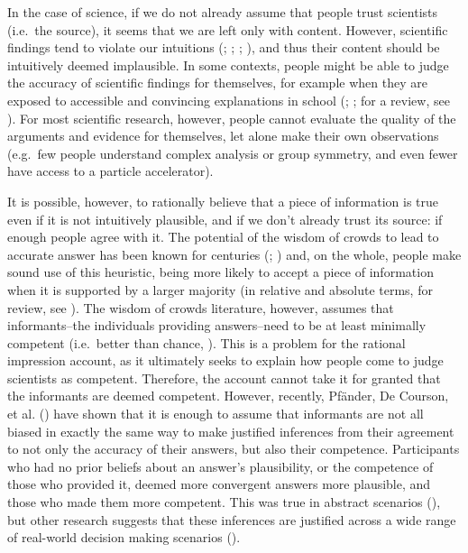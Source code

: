 \documentclass[
  man,
  floatsintext,
  longtable,
  nolmodern,
  notxfonts,
  notimes,
  colorlinks=true,linkcolor=blue,citecolor=blue,urlcolor=blue]{apa7}
\begin{document}
In the case of science, if we do not already assume that people trust
scientists (i.e.~the source), it seems that we are left only with
content. However, scientific findings tend to violate our intuitions
(;
;
;
), and
thus their content should be intuitively deemed implausible. In some
contexts, people might be able to judge the accuracy of scientific
findings for themselves, for example when they are exposed to accessible
and convincing explanations in school
(;
; for a review, see
). For most scientific research, however, people cannot evaluate
the quality of the arguments and evidence for themselves, let alone make
their own observations (e.g.~few people understand complex analysis or
group symmetry, and even fewer have access to a particle accelerator).

It is possible, however, to rationally believe that a piece of
information is true even if it is not intuitively plausible, and if we
don't already trust its source: if enough people agree with it. The
potential of the wisdom of crowds to lead to accurate answer has been
known for centuries
(;
)
and, on the whole, people make sound use of this heuristic, being more
likely to accept a piece of information when it is supported by a larger
majority (in relative and absolute terms, for review, see
). The
wisdom of crowds literature, however, assumes that informants--the
individuals providing answers--need to be at least minimally competent
(i.e.~better than chance,
).
This is a problem for the rational impression account, as it ultimately
seeks to explain how people come to judge scientists as competent.
Therefore, the account cannot take it for granted that the informants
are deemed competent. However, recently, Pfänder, De Courson, et al.
() have shown that it is
enough to assume that informants are not all biased in exactly the same
way to make justified inferences from their agreement to not only the
accuracy of their answers, but also their competence. Participants who
had no prior beliefs about an answer's plausibility, or the competence
of those who provided it, deemed more convergent answers more plausible,
and those who made them more competent. This was true in abstract
scenarios (), but other research suggests that these inferences are
justified across a wide range of real-world decision making scenarios
().
\end{document}
